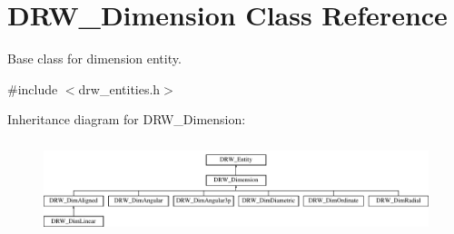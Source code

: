 \hypertarget{classDRW__Dimension}{\section{D\-R\-W\-\_\-\-Dimension Class Reference}
\label{classDRW__Dimension}
}


Base class for dimension entity.  




{\ttfamily \#include $<$drw\-\_\-entities.\-h$>$}

Inheritance diagram for D\-R\-W\-\_\-\-Dimension\-:\begin{figure}[H]
\begin{center}
\leavevmode
\includegraphics[height=2.765432cm]{classDRW__Dimension}
\end{center}
\end{figure}
